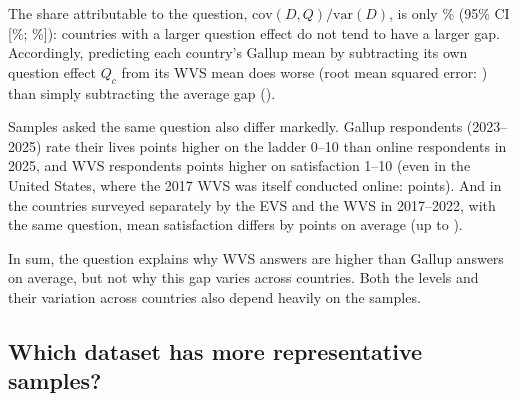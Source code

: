 \documentclass[12pt]{article}
\begin{document}
The share attributable to the question, $\mathrm{cov}(D,Q)/\mathrm{var}(D)$, is only \decompVarShareQuestionPct\% (95\% CI [\decompLowVarShareQuestionPct\%; \decompHighVarShareQuestionPct\%]): %
countries with a larger question effect do not tend to have a larger gap. Accordingly, predicting each country's Gallup mean by subtracting its own question effect $Q_c$ from its WVS mean does worse (root mean squared error: \decompRmsePredictionGallup) than simply subtracting the average gap (\decompRmseNaive). 

Samples asked the same question also differ markedly. Gallup respondents (2023--2025) rate their lives \meanSampleEffectGallup points higher on the ladder 0--10 than online respondents in 2025, and WVS respondents \meanSampleEffectWVS points higher on satisfaction 1--10 (even in the United States, where the 2017 WVS was itself conducted online: \sampleEffectUSWVS points). And in the \nEVSvsWVS countries surveyed separately by the EVS and the WVS in 2017--2022, with the same question, mean satisfaction differs by \meanAbsDiffEVSWVS points on average (up to \maxAbsDiffEVSWVS).

In sum, the question explains why WVS answers are higher than Gallup answers on average, but not why this gap varies across countries. Both the levels and their variation across countries also depend heavily on the samples.

\subsection{Which dataset has more representative samples?}\label{subsec:data_quality}
\end{document}
